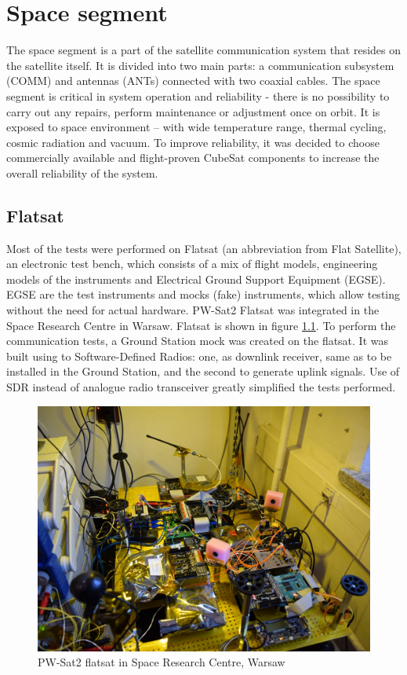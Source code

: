 \chapter{Space segment}
The space segment is a part of the satellite communication system that resides on the satellite itself. It is divided into two main parts: a communication subsystem (COMM) and antennas (ANTs) connected with two coaxial cables. The space segment is critical in system operation and reliability - there is no possibility to carry out any repairs, perform maintenance or adjustment once on orbit. It is exposed to space environment – with wide temperature range, thermal cycling, cosmic radiation and vacuum. To improve reliability, it was decided to choose commercially available and flight-proven CubeSat components to increase the overall reliability of the system.

\section{Flatsat}
Most of the tests were performed on Flatsat (an abbreviation from Flat Satellite), an electronic test bench, which consists of a mix of flight models, engineering models of the instruments and Electrical Ground Support Equipment (EGSE). EGSE are the test instruments and mocks (fake) instruments, which allow testing without the need for actual hardware. PW-Sat2 Flatsat was integrated in the Space Research Centre in Warsaw. Flatsat is shown in figure \ref{flatsat_photo}. To perform the communication tests, a Ground Station mock was created on the flatsat. It was built using to Software-Defined Radios: one, as downlink receiver, same as to be installed in the Ground Station, and the second to generate uplink signals. Use of SDR instead of analogue radio transceiver greatly simplified the tests performed.

\begin{figure}[H]
    \centering
    \includegraphics[width=0.46\paperwidth]{img/6/flatsat.jpg}
    \caption{PW-Sat2 flatsat in Space Research Centre, Warsaw}
    \label{flatsat_photo}
\end{figure}

